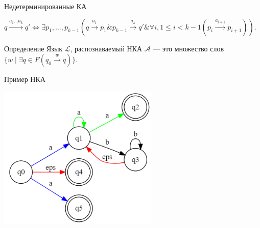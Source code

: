 \documentclass[mathserif]{beamer}
\newcommand{\Lang}{\mathscr{L}} %
\def\logand{\mathrel{\&}}
\def\iff{\mathrel{\Leftrightarrow}}
\def\Aut{\mathscr{A}}
\newenvironment{wideitemize}{\itemize\addtolength{\itemsep}{8pt}}{\enditemize}
\newcommand{\transit}[1]{\overset{#1}{\longrightarrow}}
\begin{document}
\begin{frame}{Недетерминированные КА}
{\begin{wideitemize}
            \item $q \overset{a_1\dots a_k}{\longrightarrow} q'\iff \exists p_1,\dots,p_{k-1}(q\overset{a_1}{\longrightarrow}p_1\logand p_{k-1}\overset{a_k}{\longrightarrow}q'\logand \forall i,1\leq i<k-1(p_i\overset{a_{i+1}}{\longrightarrow}p_{i+1}))$.
        \end{wideitemize}

        \vspace{-5pt}
        \begin{block}{Определение}
            Язык $\Lang$, распознаваемый НКА $\Aut$ --- это множество слов $\bigl\lbrace{}w\mid\exists q\in F (q_0\transit{w}q)\bigr\rbrace{}$.
        \end{block}
    }
\end{frame} %

\begin{frame}{Пример НКА}
    \vspace{-5pt}
    \begin{center}
        \includegraphics[width=3in, keepaspectratio]{tompson1.png} %
    \end{center}
\end{frame}%
\end{document}
